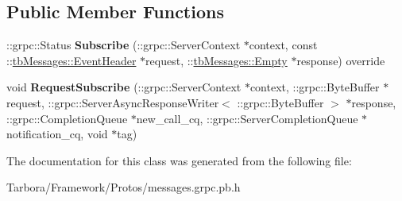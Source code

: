 \subsection*{Public Member Functions}
\begin{DoxyCompactItemize}
\item 
\mbox{\label{classtbMessages_1_1TarboraMessages_1_1WithRawMethod__Subscribe_a53c8268f22237b33e93f7167547b4e9e}} 
\+::grpc\+::\+Status {\bfseries Subscribe} (\+::grpc\+::\+Server\+Context $\ast$context, const \+::\hyperlink{classtbMessages_1_1EventHeader}{tb\+Messages\+::\+Event\+Header} $\ast$request, \+::\hyperlink{classtbMessages_1_1Empty}{tb\+Messages\+::\+Empty} $\ast$response) override
\item 
\mbox{\label{classtbMessages_1_1TarboraMessages_1_1WithRawMethod__Subscribe_af8990bdb01b03de011318376329ef1a0}} 
void {\bfseries Request\+Subscribe} (\+::grpc\+::\+Server\+Context $\ast$context, \+::grpc\+::\+Byte\+Buffer $\ast$request, \+::grpc\+::\+Server\+Async\+Response\+Writer$<$ \+::grpc\+::\+Byte\+Buffer $>$ $\ast$response, \+::grpc\+::\+Completion\+Queue $\ast$new\+\_\+call\+\_\+cq, \+::grpc\+::\+Server\+Completion\+Queue $\ast$notification\+\_\+cq, void $\ast$tag)
\end{DoxyCompactItemize}


The documentation for this class was generated from the following file\+:\begin{DoxyCompactItemize}
\item 
Tarbora/\+Framework/\+Protos/messages.\+grpc.\+pb.\+h\end{DoxyCompactItemize}

